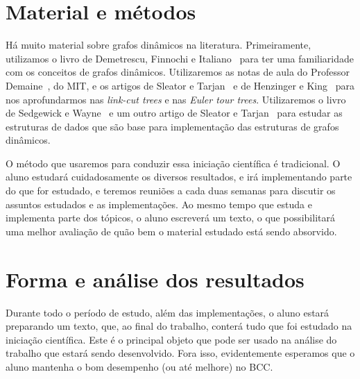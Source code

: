 \documentclass[12pt]{article}
\begin{document}





\section{Material e métodos}  

Há muito material sobre grafos dinâmicos na literatura.
Primeiramente, utilizamos o livro de Demetrescu, Finnochi e Italiano~\cite{DemetrescuFI2004} 
para ter uma familiaridade com os conceitos de grafos dinâmicos. 
Utilizaremos as notas de aula do Professor Demaine~\cite{DemaineHJSI2012, DemaineL2007}, do MIT, 
e os artigos de Sleator e Tarjan~\cite{SleatorT1983} e de Henzinger e King~\cite{HenzingerK1995} 
para nos aprofundarmos nas \emph{link-cut trees} e nas \emph{Euler tour trees}. 
Utilizaremos o livro de Sedgewick e Wayne~\cite{SedgewickW2011} e um outro artigo de 
Sleator e Tarjan~\cite{SleatorT1985} para estudar as estruturas de dados que são base 
para implementação das estruturas de grafos dinâmicos.

O método que usaremos para conduzir essa iniciação científica é tradicional. 
O aluno estudará cuidadosamente os diversos resultados, e irá implementando 
parte do que for estudado, e teremos reuniões a cada duas semanas para discutir 
os assuntos estudados e as implementações.  Ao mesmo tempo que estuda e implementa
parte dos tópicos, o aluno escreverá um texto, o que possibilitará uma melhor 
avaliação de quão bem o material estudado está sendo absorvido.

\section{Forma e análise dos resultados}  

Durante todo o período de estudo, além das implementações, o aluno estará preparando 
um texto, que, ao final do trabalho, conterá tudo que foi estudado na iniciação científica. 
Este é o principal objeto que pode ser usado na análise do trabalho que estará sendo desenvolvido.
Fora isso, evidentemente esperamos que o aluno mantenha o bom desempenho (ou até melhore) no BCC. 



\end{document}
